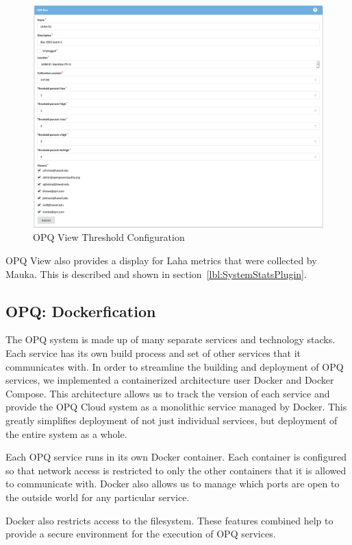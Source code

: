 \begin{figure}
	\centering
	\includegraphics[width=1\linewidth]{figures/view_thresholds.png}
	\caption{OPQ View Threshold Configuration}\label{fig:view_thresholds}
\end{figure}

OPQ View also provides a display for Laha metrics that were collected by Mauka. This is described and shown in section~\ref{lbl:SystemStatsPlugin}.

\subsection{OPQ: Dockerfication}\label{subsec:opq:-dockerfication}
The OPQ system is made up of many separate services and technology stacks. Each service has its own build process and set of other services that it communicates with. In order to streamline the building and deployment of OPQ services, we implemented a containerized architecture user Docker and Docker Compose. This architecture allows us to track the version of each service and provide the OPQ Cloud system as a monolithic service managed by Docker. This greatly simplifies deployment of not just individual services, but deployment of the entire system as a whole.

Each OPQ service runs in its own Docker container. Each container is configured so that network access is restricted to only the other containers that it is allowed to communicate with. Docker also allows us to manage which ports are open to the outside world for any particular service.

Docker also restricts access to the filesystem. These features combined help to provide a secure environment for the execution of OPQ services.


